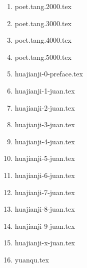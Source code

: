 \documentclass[12pt]{ctexart}
\begin{document}
\begin{enumerate}
\item poet.tang.2000.tex
\item poet.tang.3000.tex
\item poet.tang.4000.tex
\item poet.tang.5000.tex
\item huajianji-0-preface.tex
\item huajianji-1-juan.tex
\item huajianji-2-juan.tex
\item huajianji-3-juan.tex
\item huajianji-4-juan.tex
\item huajianji-5-juan.tex
\item huajianji-6-juan.tex
\item huajianji-7-juan.tex
\item huajianji-8-juan.tex
\item huajianji-9-juan.tex
\item huajianji-x-juan.tex
\item yuanqu.tex
\end{enumerate}
\end{document}
